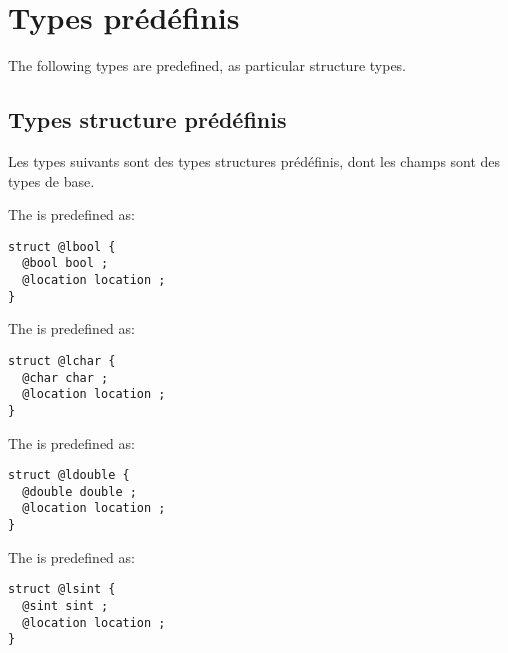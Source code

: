 
\chapter{Types prédéfinis}

The following types are predefined, as particular structure types.

\section{Types structure prédéfinis}

Les types suivants sont des types structures prédéfinis, dont les champs sont des types de base.
 

The  is predefined as:
\begin{lstlisting}[language=galgas]
struct @lbool {
  @bool bool ;
  @location location ;
}
\end{lstlisting}





The  is predefined as:
\begin{lstlisting}[language=galgas]
struct @lchar {
  @char char ;
  @location location ;
}
\end{lstlisting}








The  is predefined as:
\begin{lstlisting}[language=galgas]
struct @ldouble {
  @double double ;
  @location location ;
}
\end{lstlisting}








The  is predefined as:
\begin{lstlisting}[language=galgas]
struct @lsint {
  @sint sint ;
  @location location ;
}
\end{lstlisting}








